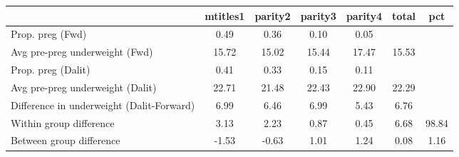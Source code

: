 \begin{tabular}{l*{6}{c}}
\toprule
            &\multicolumn{1}{c}{mtitles1}&\multicolumn{1}{c}{parity2}&\multicolumn{1}{c}{parity3}&\multicolumn{1}{c}{parity4}&\multicolumn{1}{c}{total}&\multicolumn{1}{c}{pct}\\
\midrule
\midrule
Prop. preg (Fwd)&        0.49&        0.36&        0.10&        0.05&            &            \\
Avg pre-preg underweight (Fwd)&       15.72&       15.02&       15.44&       17.47&       15.53&            \\
Prop. preg (Dalit)&        0.41&        0.33&        0.15&        0.11&            &            \\
Avg pre-preg underweight (Dalit)&       22.71&       21.48&       22.43&       22.90&       22.29&            \\
Difference in underweight (Dalit-Forward)&        6.99&        6.46&        6.99&        5.43&        6.76&            \\
Within group difference&        3.13&        2.23&        0.87&        0.45&        6.68&       98.84\\
Between group difference&       -1.53&       -0.63&        1.01&        1.24&        0.08&        1.16\\
\bottomrule
\end{tabular}
